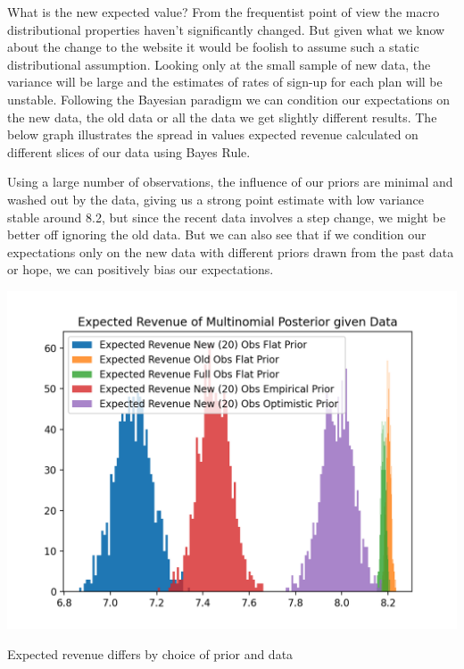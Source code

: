 \documentclass{tufte-handout}
\begin{document}
\noindent What is the new expected value? From the frequentist point of view the macro distributional properties haven't significantly changed. But given what we know about the change to the website it would be foolish to assume such a static distributional assumption. Looking only at the small sample of new data, the variance will be large and the estimates of rates of sign-up for each plan will be unstable.  Following the Bayesian paradigm we can condition our expectations on the new data, the old data or all the data we get slightly different results. The below graph illustrates the spread in values expected revenue calculated on different slices of our data using Bayes Rule.

\noindent Using a large number of observations, the influence of our priors are minimal and washed out by the data, giving us a strong point estimate with low variance stable around 8.2, but since the recent data involves a step change, we might be better off ignoring the old data. But we can also see that if we condition our expectations only on the new data with different priors drawn from the past data or hope, we can positively bias our expectations.
\linebreak

\begin{marginfigure}
  \includegraphics[width=\linewidth]{../Expectation/Plots/expected_revenue_distributions.png}
  \caption{Expected revenue differs by choice of prior and data}
\end{marginfigure}
\end{document}
